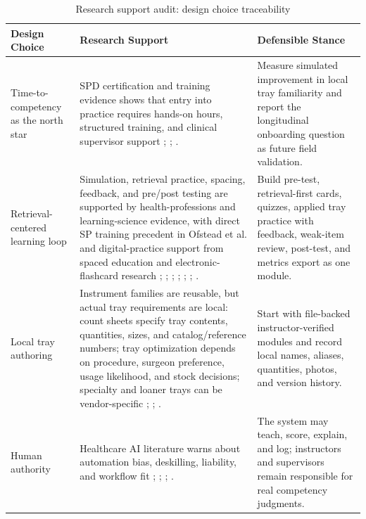 \documentclass[10pt,a4paper]{article}
\begin{document}
\begin{table}[H]
\centering
\caption{Research support audit: design choice traceability}
\label{tab:research-support-audit-design-choice-traceability}
\small\renewcommand{\arraystretch}{1.2}\setlength{\tabcolsep}{4pt}
\begin{tabularx}{\textwidth}{|>{\raggedright\arraybackslash}X|>{\raggedright\arraybackslash}X|>{\raggedright\arraybackslash}X|}
\hline
Design Choice & Research Support & Defensible Stance \\
\hline
Time-to-competency as the north star & SPD certification and training evidence shows that entry into practice requires hands-on hours, structured training, and clinical supervisor support \cite{hspa-crcst-accessed-2026}; \cite{chobin-2010}; \cite{aorn-staffing-shortage-2025}. & Measure simulated improvement in local tray familiarity and report the longitudinal onboarding question as future field validation. \\
\hline
Retrieval-centered learning loop & Simulation, retrieval practice, spacing, feedback, and pre/post testing are supported by health-professions and learning-science evidence, with direct SP training precedent in Ofstead et al. and digital-practice support from spaced education and electronic-flashcard research \cite{ofstead-et-al-2023}; \cite{cook-et-al-2011}; \cite{roediger-and-karpicke-2006}; \cite{larsen-et-al-2009}; \cite{martinengo-et-al-2024}; \cite{barrison-et-al-2025}; \cite{hattie-and-timperley-2007}. & Build pre-test, retrieval-first cards, quizzes, applied tray practice with feedback, weak-item review, post-test, and metrics export as one module. \\
\hline
Local tray authoring & Instrument families are reusable, but actual tray requirements are local: count sheets specify tray contents, quantities, sizes, and catalog/reference numbers; tray optimization depends on procedure, surgeon preference, usage likelihood, and stock decisions; specialty and loaner trays can be vendor-specific \cite{nadeau-2024}; \cite{dos-santos-et-al-2021}; \cite{ahmadi-et-al-2023}. & Start with file-backed instructor-verified modules and record local names, aliases, quantities, photos, and version history. \\
\hline
Human authority & Healthcare AI literature warns about automation bias, deskilling, liability, and workflow fit \cite{goddard-et-al-2012}; \cite{natali-et-al-2025}; \cite{kelly-2026}; \cite{zheng-et-al-2023}. & The system may teach, score, explain, and log; instructors and supervisors remain responsible for real competency judgments. \\

\end{tabularx}
\end{table}
\end{document}

